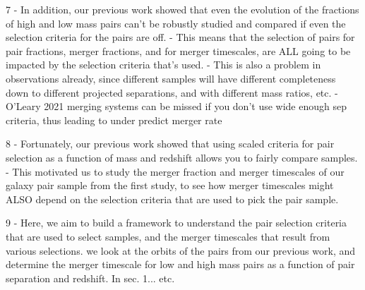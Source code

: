 \documentclass[twocolumn,linenumbers]{aastex631}
\begin{document}



7 - In addition, our previous work showed that even the evolution of the fractions of high and low mass pairs can't be robustly studied and compared if even the selection criteria for the pairs are off. 
    - This means that the selection of pairs for pair fractions, merger fractions, and for merger timescales, are ALL going to be impacted by the selection criteria that's used. 
    - This is also a problem in observations already, since different samples will have different completeness down to different projected separations, and with different mass ratios, etc. 
    - O'Leary 2021 merging systems can be missed if you don't use wide enough sep criteria, thus leading to under predict merger rate

8 - Fortunately, our previous work showed that using scaled criteria for pair selection as a function of mass and redshift allows you to fairly compare samples. 
    - This motivated us to study the merger fraction and merger timescales of our galaxy pair sample from the first study, to see how merger timescales might ALSO depend on the selection criteria that are used to pick the pair sample. 


9 - Here, we aim to build a framework to understand the pair selection criteria that are used to select samples, and the merger timescales that result from various selections.  we look at the orbits of the pairs from our previous work, and determine the merger timescale for low and high mass pairs as a function of pair separation and redshift. In sec. 1... etc. 
\end{document}
